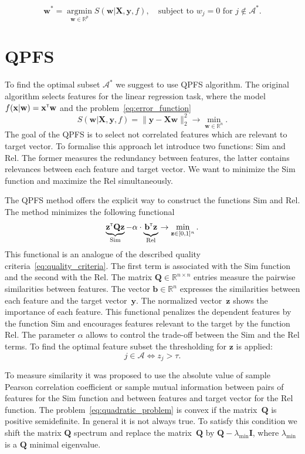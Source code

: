 \documentclass[a4paper,12pt]{article}
\theoremstyle{plain} %
\theoremstyle{definition} %
\theoremstyle{remark} %
\newcommand{\bw}{\mathbf{w}}
\newcommand{\by}{\mathbf{y}}
\newcommand{\bx}{\mathbf{x}}
\newcommand{\bz}{\mathbf{z}}
\newcommand{\cA}{\mathcal{A}}
\newcommand{\bQ}{\mathbf{Q}}
\newcommand{\bbR}{\mathbb{R}}
\newcommand{\bX}{\mathbf{X}}
\newcommand{\T}{{\text{\tiny\sffamily\upshape\mdseries T}}}
\newcommand{\argmin}{\mathop{\arg \min}\limits}
\begin{document}
	\begin{equation}
		\bw^* = \argmin_{\bw \in \bbR^p} S(\bw | \bX, \by, f), \quad \text{subject to } w_j = 0 \text{ for } j \notin \cA^*.
		\label{eq:reduced_error_function}
	\end{equation}
	
	\section*{QPFS}
	
	To find the optimal subset $\cA^*$ we suggest to use QPFS algorithm.
	The original algorithm selects features for the linear regression task, where the model $f(\bx | \bw) = \bx^{\T} \bw$ and the problem~\ref{eq:error_function}
	\[
		S(\bw | \bX, \by, f) =  \| \by - \bX \bw\|_2^2 \rightarrow\min_{\bw \in \bbR^{n}}.
	\]
	The goal of the QPFS is to select not correlated features which are relevant to target vector.
	To formalise this approach let introduce two functions: Sim and Rel. 
	The former measures the redundancy between features, the latter contains relevances between each feature and target vector. 
	We want to minimize the Sim function and maximize the Rel simultaneously.
	
	The QPFS method offers the explicit way to construct the functions Sim and Rel. 
	The method minimizes the following functional
	\begin{equation}
		\underbrace{\bz^{\T} \bQ \bz}_{\text{Sim}} - \alpha \cdot \underbrace{\vphantom{()} \mathbf{b}^{\T} \bz}_{\text{Rel}} \rightarrow \min_{\bz \in [0, 1]^n}.
		\label{eq:quadratic_problem}
	\end{equation}
	This functional is an analogue of the described quality criteria~\ref{eq:quality_criteria}.
  	The first term is associated with the Sim function and the second with the Rel. 
  	The matrix $\bQ \in \bbR^{n \times n}$ entries measure the pairwise similarities between features. 
  	The vector $\mathbf{b} \in \bbR^n$ expresses the similarities between each feature and the target vector~$\by$.
  	The normalized vector~$\bz$ shows the importance of each feature. 
  	This functional penalizes the dependent features by the function Sim and encourages features relevant to the target by the function Rel. 
  	The parameter $\alpha$ allows to control the trade-off between the Sim and the Rel terms.
  	To find the optimal feature subset the thresholding for $\bz$ is applied:
  	\[
  		j \in \mathcal{A} \Leftrightarrow z_j > \tau.
  	\]
  	
  	To measure similarity it was proposed to use the absolute value of sample Pearson correlation coefficient or sample mutual information between pairs of features for the Sim function and between features and target vector for the Rel function.
  	The problem~\ref{eq:quadratic_problem} is convex if the matrix~$\bQ$ is positive semidefinite. In general it is not always true. 
  	To satisfy this condition we shift the matrix $\bQ$ spectrum and replace the matrix~$\bQ$ by $\bQ - \lambda_{\text{min}} \mathbf{I}$, where $\lambda_{\text{min}} $ is a $\bQ$ minimal eigenvalue.
  	
\end{document}
